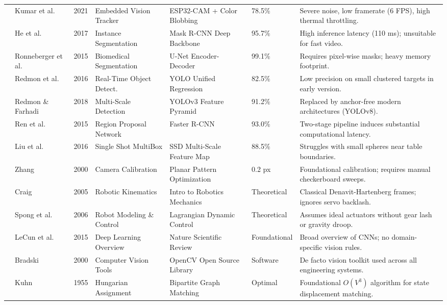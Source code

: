 \begin{footnotesize}
\begin{longtable}{|c|p{1.7cm}|c|p{2.1cm}|p{2.6cm}|p{1.2cm}|p{2.9cm}|}
\cite{ref28} & Kumar et al. & 2021 & Embedded Vision Tracker & ESP32-CAM + Color Blobbing & 78.5\% & Severe noise, low framerate (6 FPS), high thermal throttling. \\
\cite{ref29} & He et al. & 2017 & Instance Segmentation & Mask R-CNN Deep Backbone & 95.7\% & High inference latency (110 ms); unsuitable for fast video. \\
\cite{ref30} & Ronneberger et al. & 2015 & Biomedical Segmentation & U-Net Encoder-Decoder & 99.1\% & Requires pixel-wise masks; heavy memory footprint. \\
\cite{ref31} & Redmon et al. & 2016 & Real-Time Object Detect. & YOLO Unified Regression & 82.5\% & Low precision on small clustered targets in early version. \\
\cite{ref32} & Redmon \& Farhadi & 2018 & Multi-Scale Detection & YOLOv3 Feature Pyramid & 91.2\% & Replaced by anchor-free modern architectures (YOLOv8). \\
\cite{ref33} & Ren et al. & 2015 & Region Proposal Network & Faster R-CNN & 93.0\% & Two-stage pipeline induces substantial computational latency. \\
\cite{ref34} & Liu et al. & 2016 & Single Shot MultiBox & SSD Multi-Scale Feature Map & 88.5\% & Struggles with small spheres near table boundaries. \\
\cite{ref35} & Zhang & 2000 & Camera Calibration & Planar Pattern Optimization & 0.2 px & Foundational calibration; requires manual checkerboard sweeps. \\
\cite{ref36} & Craig & 2005 & Robotic Kinematics & Intro to Robotics Mechanics & Theoretical & Classical Denavit-Hartenberg frames; ignores servo backlash. \\
\cite{ref37} & Spong et al. & 2006 & Robot Modeling \& Control & Lagrangian Dynamic Control & Theoretical & Assumes ideal actuators without gear lash or gravity droop. \\
\cite{ref38} & LeCun et al. & 2015 & Deep Learning Overview & Nature Scientific Review & Foundational & Broad overview of CNNs; no domain-specific vision rules. \\
\cite{ref39} & Bradski & 2000 & Computer Vision Tools & OpenCV Open Source Library & Software & De facto vision toolkit used across all engineering systems. \\
\cite{ref40} & Kuhn & 1955 & Hungarian Assignment & Bipartite Graph Matching & Optimal & Foundational $O(V^3)$ algorithm for state displacement matching. \\
\end{longtable}
\end{footnotesize}

